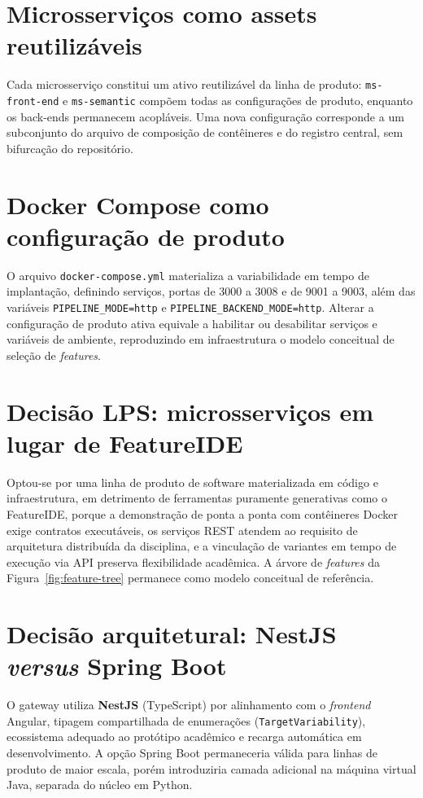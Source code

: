 \documentclass[12pt]{article}
\begin{document}
\section{Microsserviços como assets reutilizáveis}
Cada microsserviço constitui um ativo reutilizável da linha de produto: \texttt{ms-front-end} e \texttt{ms-semantic} compõem todas as configurações de produto, enquanto os back-ends permanecem acopláveis. Uma nova configuração corresponde a um subconjunto do arquivo de composição de contêineres e do registro central, sem bifurcação do repositório.

\section{Docker Compose como configuração de produto}
O arquivo \texttt{docker-compose.yml} materializa a variabilidade em tempo de implantação, definindo serviços, portas de 3000 a 3008 e de 9001 a 9003, além das variáveis \texttt{PIPELINE\_MODE=http} e \texttt{PIPELINE\_BACKEND\_MODE=http}. Alterar a configuração de produto ativa equivale a habilitar ou desabilitar serviços e variáveis de ambiente, reproduzindo em infraestrutura o modelo conceitual de seleção de \emph{features}.

\section{Decisão LPS: microsserviços em lugar de FeatureIDE}
Optou-se por uma linha de produto de software materializada em código e infraestrutura, em detrimento de ferramentas puramente generativas como o FeatureIDE, porque a demonstração de ponta a ponta com contêineres Docker exige contratos executáveis, os serviços REST atendem ao requisito de arquitetura distribuída da disciplina, e a vinculação de variantes em tempo de execução via API preserva flexibilidade acadêmica. A árvore de \emph{features} da Figura~\ref{fig:feature-tree} permanece como modelo conceitual de referência.

\section{Decisão arquitetural: NestJS \emph{versus} Spring Boot}
O gateway utiliza \textbf{NestJS} (TypeScript) por alinhamento com o \emph{frontend} Angular, tipagem compartilhada de enumerações (\texttt{TargetVariability}), ecossistema adequado ao protótipo acadêmico e recarga automática em desenvolvimento. A opção Spring Boot permaneceria válida para linhas de produto de maior escala, porém introduziria camada adicional na máquina virtual Java, separada do núcleo em Python.
\end{document}
